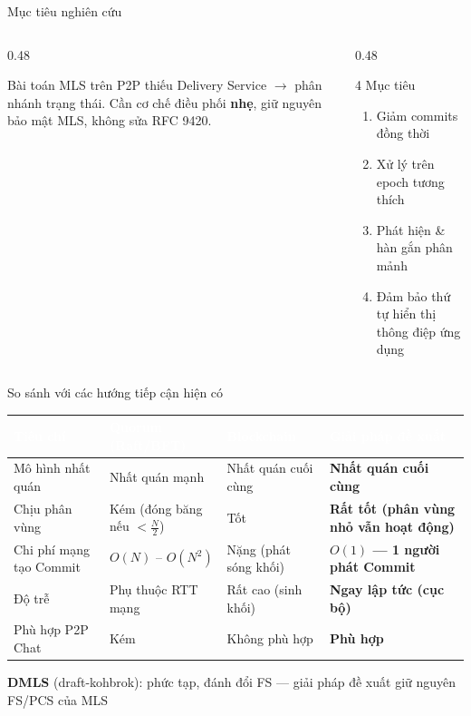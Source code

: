 \documentclass[t, aspectratio=169]{beamer}
\begin{document}
\begin{frame}[c]{Mục tiêu nghiên cứu}
	\begin{columns}[c]
		\begin{column}{0.48\textwidth}
			\begin{block}{Bài toán}
				\small
				MLS trên P2P thiếu Delivery Service $\to$ \alert{phân nhánh trạng thái}. Cần cơ chế điều phối \textbf{nhẹ}, giữ nguyên bảo mật MLS, không sửa RFC 9420.
			\end{block}
		\end{column}
		\begin{column}{0.48\textwidth}
			\begin{block}{4 Mục tiêu}
				\small
				\begin{enumerate}
					\item Giảm commits đồng thời
					\item Xử lý trên epoch tương thích
					\item Phát hiện \& hàn gắn phân mảnh
					\item Đảm bảo thứ tự hiển thị thông điệp ứng dụng
				\end{enumerate}
			\end{block}
		\end{column}
	\end{columns}
\end{frame}

\begin{frame}[c]{So sánh với các hướng tiếp cận hiện có}
	\footnotesize
	\begin{center}
	\begin{tabular}{|p{3.2cm}|p{3.0cm}|p{2.8cm}|p{3.2cm}|}
		\hline
		\rowcolor{hustprimary!85}\textcolor{white}{\textbf{Tiêu chí}} & \textcolor{white}{\textbf{Quorum (Raft/BFT)}} & \textcolor{white}{\textbf{Blockchain}} & \textcolor{white}{\textbf{Giải pháp đề xuất}} \\
		\hline
		Mô hình nhất quán & Nhất quán mạnh & Nhất quán cuối cùng & \textbf{Nhất quán cuối cùng} \\
		\hline
		Chịu phân vùng & Kém (đóng băng nếu $<\frac{N}{2}$) & Tốt & \textbf{Rất tốt (phân vùng nhỏ vẫn hoạt động)} \\
		\hline
		Chi phí mạng tạo Commit & $O(N)$ -- $O(N^2)$ & Nặng (phát sóng khối) & \textbf{$O(1)$ --- 1 người phát Commit} \\
		\hline
		Độ trễ & Phụ thuộc RTT mạng & Rất cao (sinh khối) & \textbf{Ngay lập tức (cục bộ)} \\
		\hline
		Phù hợp P2P Chat & Kém & Không phù hợp & \textbf{Phù hợp} \\
		\hline
	\end{tabular}
	\end{center}
	\vspace{0.3em}
	\centering \small \textbf{DMLS} (draft-kohbrok): phức tạp, đánh đổi FS --- \alert{giải pháp đề xuất giữ nguyên FS/PCS của MLS}
\end{frame}
\end{document}

